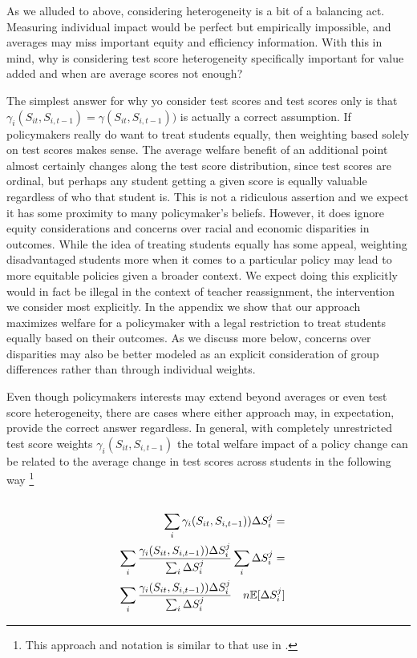 \documentclass{article}
\theoremstyle{definition}
\theoremstyle{definition}
\theoremstyle{definition}
\theoremstyle{definition}
\begin{document}
    As we alluded to above, considering heterogeneity is a bit of a balancing act. Measuring individual impact would be perfect but empirically impossible, and averages may miss important equity and efficiency information. With this in mind, why is considering test score heterogeneity specifically important for value added and when are average scores not enough? 
    
    The simplest answer for why yo consider test scores and test scores only is that $\gamma_i(S_{it}, S_{i,t-1}) = \gamma(S_{it}, S_{i,t-1}))$ is actually a correct assumption. If policymakers really do want to treat students equally, then weighting based solely on test scores makes sense. The average welfare benefit of an additional point almost certainly changes along the test score distribution, since test scores are ordinal, but perhaps any student getting a given score is equally valuable regardless of who that student is. This is not a ridiculous assertion and we expect it has some proximity to many policymaker's beliefs. However, it does ignore equity considerations and concerns over racial and economic disparities in outcomes. While the idea of treating students equally has some appeal, weighting disadvantaged students more when it comes to a particular policy may lead to more equitable policies given a broader context. We expect doing this explicitly would in fact be illegal in the context of teacher reassignment, the intervention we consider most explicitly. In the appendix we show that our approach maximizes welfare for a policymaker with a legal restriction to treat students equally based on their outcomes. As we discuss more below, concerns over disparities may also be better modeled as an explicit consideration of group differences rather than through individual weights. 
    
    Even though policymakers interests may extend beyond averages or even test score heterogeneity, there are cases where either approach may, in expectation, provide the correct answer regardless. In general, with completely unrestricted test score weights $\gamma_i(S_{it}, S_{i,t-1})$ the total welfare impact of a policy change can be related to the average change in test scores across students in the following way \footnote{This approach and notation is similar to that use in \cite{Keyser_2020}. }
    \large
    \begin{align*}
       \\ \sum_i \gamma_i(S_{it}, S_{i,t-1})) \Delta S_i^j =&
       \\ \sum_i \frac{\gamma_i(S_{it}, S_{i,t-1}))\Delta S_i^j}{\sum_i \Delta S_i^j} \sum_i \Delta S_i^j =&
       \\ \sum_i \frac{\gamma_i(S_{it}, S_{i,t-1}))\Delta S_i^j}{\sum_i \Delta S_i^j} \quad n \mathbb{E}[\Delta S_i^j] 
    \end{align*}
      \normalsize 
    
\end{document}
